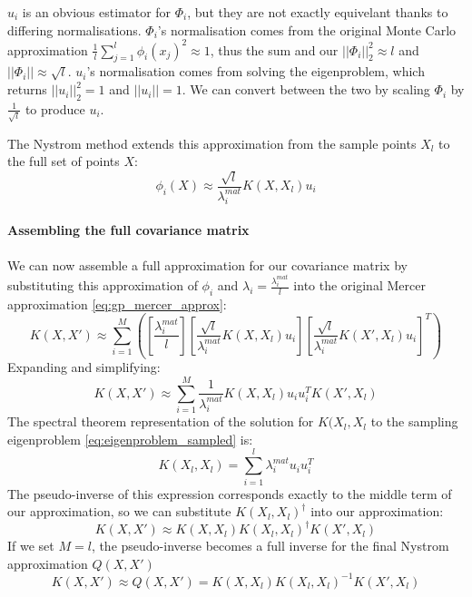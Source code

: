 $u_i$ is an obvious estimator for $\Phi_i$, but they are not exactly equivelant thanks to differing normalisations. $\Phi_i$'s normalisation comes from the original Monte Carlo approximation $\frac{1}{l} \sum_{j=1}^{l} \phi_i(x_j)^2 \approx 1$, thus the sum and our $||\Phi_i||_2^2 \approx l$ and $||\Phi_i|| \approx \sqrt{l}$. $u_i$'s normalisation comes from solving the eigenproblem, which returns $||u_i||_2^2 = 1$ and $||u_i|| = 1$. We can convert between the two by scaling $\Phi_i$ by $\frac{1}{\sqrt{l}}$ to produce $u_i$.

The Nystrom method \cite{nystrom} extends this approximation from the sample points $X_l$ to the full set of points $X$:
\begin{equation*}
    \phi_i(X) \approx \frac{\sqrt{l}}{\lambda_i^{mat}} K(X, X_l) u_i
\end{equation*}

\paragraph{Assembling the full covariance matrix}
We can now assemble a full approximation for our covariance matrix by substituting this approximation of $\phi_i$ and $\lambda_i = \frac{\lambda_i^{mat}}{l}$ into the original Mercer approximation \ref{eq:gp_mercer_approx}:
\begin{equation*}
    K(X, X') \approx \sum_{i=1}^{M} \left( \left[ \frac{\lambda_i^{mat}}{l} \right] \left[ \frac{\sqrt{l}}{\lambda_i^{mat}} K(X, X_l) u_i \right] \left[ \frac{\sqrt{l}}{\lambda_i^{mat}} K(X', X_l) u_i \right]^T \right)
\end{equation*}
Expanding and simplifying:
\begin{equation*}
    K(X, X') \approx \sum_{i=1}^{M} \frac{1}{\lambda_i^{mat}} K(X, X_l) u_i u_i^T K(X', X_l)
\end{equation*}
The spectral theorem representation of the solution for $K(X_l, X_l$ to the sampling eigenproblem \ref{eq:eigenproblem_sampled} is:
\begin{equation*}
    K(X_l, X_l) = \sum_{i=1}^{l} \lambda_i^{mat} u_i u_i^T
\end{equation*}
The pseudo-inverse of this expression corresponds exactly to the middle term of our approximation, so we can substitute $K(X_l, X_l)^{\dagger}$ into our approximation:
\begin{equation*}
    K(X, X') \approx K(X, X_l) K(X_l, X_l)^{\dagger} K(X', X_l)
\end{equation*}
If we set $M = l$, the pseudo-inverse becomes a full inverse for the final Nystrom approximation $Q(X, X')$
\begin{equation} \label{eq:nystrom_approx}
    K(X, X') \approx Q(X, X') = K(X, X_l) K(X_l, X_l)^{-1} K(X', X_l)
\end{equation}

